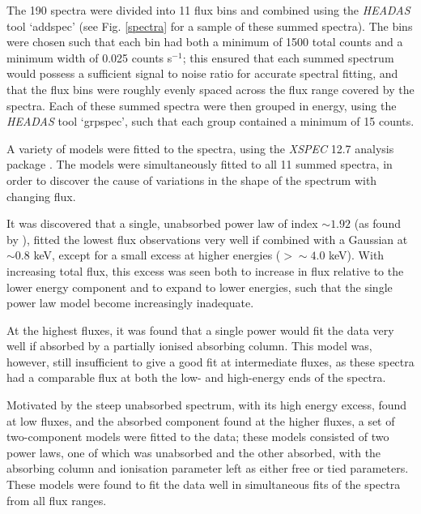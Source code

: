 \documentclass[useAMS,usenatbib]{sam}
\begin{document}

The 190 spectra were divided into 11 flux bins and combined using the {\it HEADAS} tool `addspec' (see Fig. \ref{spectra} for a sample of these summed spectra). The bins
were chosen such that each bin had both a minimum of 1500 total counts and a minimum width of 0.025 counts s$^{-1}$; this ensured that each summed spectrum would possess
a sufficient signal to noise ratio for accurate spectral fitting, and that the flux bins were roughly evenly spaced across the flux range covered by the spectra. Each of
these summed spectra were then grouped in energy, using the {\it HEADAS} tool `grpspec', such that each group contained a minimum of 15 counts.

A variety of models were fitted to the spectra, using the {\it XSPEC} 12.7 analysis package \citep{arnaud}. The models were simultaneously fitted to all 11 summed
spectra, in order to discover the cause of variations in the shape of the spectrum with changing flux.  

It was discovered that a single, unabsorbed power law of index
$\sim 1.92$ (as found by \citet{risaliti13}), fitted the lowest flux observations very well if combined with a Gaussian at $\sim 0.8$ keV, except for a small excess at
higher energies ($> \sim 4.0$ keV). With increasing total flux, this excess was seen both to increase in flux relative to the lower energy component and to expand to
lower energies, such that the single power law model become increasingly inadequate. 

At the highest fluxes, it was found that a single power would fit the data very well if absorbed by a partially ionised absorbing column. This model was, however, still
insufficient to give a good fit at intermediate fluxes, as these spectra had a comparable flux at both the low- and high-energy ends of the spectra.

Motivated by the steep unabsorbed spectrum, with its high energy excess, found at low fluxes, and the absorbed component found at the higher fluxes, a set of
two-component models were fitted to the data; these models consisted of two power laws, one of which was unabsorbed and the other absorbed, with the absorbing column and
ionisation parameter left as either free or tied parameters. These models were found to fit the data well in simultaneous fits of the spectra from all flux ranges.
\end{document}
